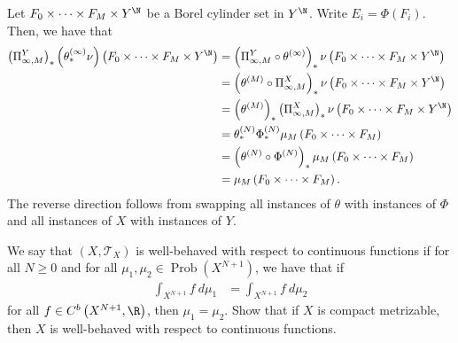 \documentclass[10pt]{mypackage}
\begin{document}
\begin{solution}
  Let $F_0\times\cdots\times F_M\times Y^{\N}$ be a Borel cylinder set in $Y^{\N}$. Write $E_i = \Phi\left( F_i \right)$. Then, we have that
  \begin{align*}
    \left( \Pi^{Y}_{\infty,M} \right)_{\ast}\left( \theta_{\ast}^{(\infty)}\nu \right)\left( F_0\times\cdots\times F_M\times Y^{\N} \right) &= \left( \Pi^{Y}_{\infty,M}\circ \theta^{(\infty)} \right)_{\ast}\nu\left( F_0\times\cdots\times F_M\times Y^{\N} \right)\\
                                                     &= \left( \theta^{(M)}\circ \Pi_{\infty,M}^{X} \right)_{\ast}\nu\left( F_0\times\cdots\times F_M\times Y^{\N} \right)\\
                                                     &= \left( \theta^{(M)} \right)_{\ast}\left( \Pi^{X}_{\infty,M} \right)_{\ast}\nu\left( F_0\times\cdots\times F_M\times Y^{\N} \right)\\
                                                     &= \theta^{(N)}_{\ast}\Phi^{(N)}_{\ast}\mu_M\left( F_0\times\cdots\times F_M \right)\\
                                                     &= \left( \theta^{(N)}\circ \Phi^{(N)} \right)_{\ast}\mu_M\left( F_0\times\cdots\times F_M \right)\\
                                                     &= \mu_M\left( F_0\times\cdots\times F_M \right).
  \end{align*}
  The reverse direction follows from swapping all instances of $\theta$ with instances of $\Phi$ and all instances of $X$ with instances of $Y$.
\end{solution}
\begin{problem}[Problem IV.2]
  We say that $\left( X,\mathcal{T}_X \right)$ is well-behaved with respect to continuous functions if for all $N\geq 0$ and for all $\mu_1,\mu_2\in \operatorname{Prob}\left( X^{N+1} \right)$, we have that if
  \begin{align*}
    \int_{X^{N+1}}^{} f\:d\mu_1 &= \int_{X^{N+1}}^{} f\:d\mu_2
  \end{align*}
  for all $f\in C^b\left( X^{N+1},\R \right)$, then $\mu_1 = \mu_2$. Show that if $X$ is compact metrizable, then $X$ is well-behaved with respect to continuous functions.
\end{problem}
\end{document}

